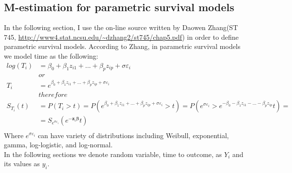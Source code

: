 \documentclass[]{article}
\let\epsilon\varepsilon
\begin{document}
\subsection{M-estimation for parametric survival models}
In the following section, I use the on-line source written by Daowen Zhang(ST 745,  \url{http://www4.stat.ncsu.edu/~dzhang2/st745/chap5.pdf}) in order to define parametric survival models. According to Zhang, in parametric survival models we model time as the following:
  $$
  \begin{aligned}
    log(T_i) &= \beta_0 + \beta_1z_{i1} + ... + \beta_p z_{ip} + \sigma \epsilon_{i}\\
    &or\\
    T_i &= e^{\beta_0 + \beta_1z_{i1} + ... + \beta_p z_{ip} + \sigma \epsilon_{i}}\\
    &therefore\\
    S_{T_i}(t) &= P(T_i>t) = P\left( e^{\beta_0 + \beta_1z_{i1} + ... + \beta_p z_{ip} + \sigma \epsilon_{i}} >t \right ) = P\left( e^{\sigma \epsilon_{i}} > e^{-\beta_0 - \beta_1z_{i1} - ... - \beta_p z_{ip}}t \right )=\\
    &=S_{e^{\sigma \epsilon_{i}}}(e^{-\pmb{z}_i \pmb{\beta}}t)\\
  \end{aligned}
  $$
Where $e^{\sigma \epsilon_{i}}$ can have variety of distributions including Weibull, exponential, gamma, log-logistic, and log-normal.\\
In the following sections we denote random variable, time to outcome, as $Y_i$ and its values as $y_i$. 
\end{document}
